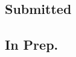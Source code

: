 \documentclass[11pt,letterpaper,sans,unicode]{moderncv}
\begin{document}
\subsection{Submitted}

\begin{etaremune}[leftmargin=8mm]

\end{etaremune}

\subsection{In Prep.}

\begin{etaremune}[leftmargin=8mm]

\end{etaremune}


%


%

\end{document}
